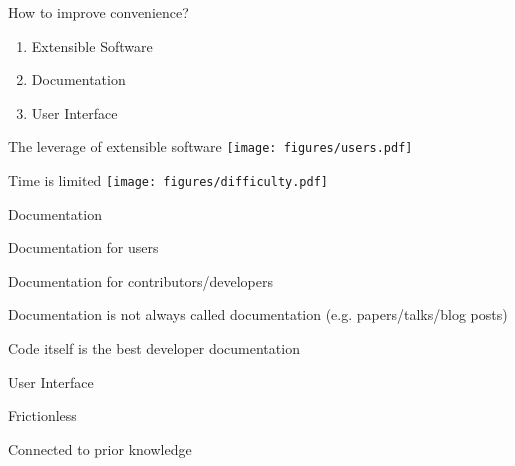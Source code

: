 \documentclass{beamer}
\newenvironment{wideitemize}{
    \itemize\addtolength{\itemsep}{15pt}\addtolength{\topsep}{10pt}}{\enditemize}
\begin{document}
    \begin{frame}{How to improve convenience?}
      \begin{enumerate}
        \item Extensible Software
        \item Documentation
        \item User Interface
      \end{enumerate}
    \end{frame}
    
    \begin{frame}[c]{The leverage of extensible software}
      \centering
      \texttt{[image: figures/users.pdf]}
    \end{frame}
    
    \begin{frame}[c]{Time is limited}
      \centering
      \texttt{[image: figures/difficulty.pdf]}
    \end{frame}

    \begin{frame}{Documentation}
      \begin{wideitemize}
        \item Documentation for users
        \item Documentation for contributors/developers
        \item<2-> Documentation is not always called documentation (e.g. papers/talks/blog posts)
                \item<3> Code itself is the best developer documentation
      \end{wideitemize}
    \end{frame}

    \begin{frame}{User Interface}
      \begin{wideitemize}
        \item Frictionless
        \item Connected to prior knowledge
      \end{wideitemize}
    \end{frame}
    
    \begin{frame}[c]
    \end{frame}
\end{document}
